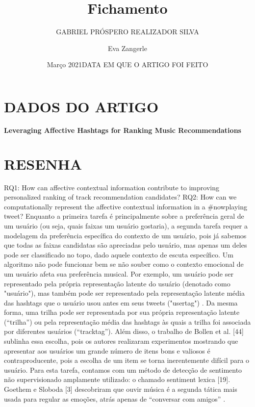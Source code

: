 \documentclass{article}
\title{Fichamento}
\author{GABRIEL PRÓSPERO REALIZADOR  SILVA}
\date{Março 2021}
\begin{document}
\maketitle

\section{DADOS DO ARTIGO}
\textbf{Leveraging Affective Hashtags for Ranking Music Recommendations \\}
\author{Eva Zangerle \\}
\date{DATA EM QUE O ARTIGO FOI FEITO}

\section{RESENHA}
RQ1: How can affective contextual information contribute to improving personalized ranking of track recommendation candidates?
RQ2: How can we computationally represent the affective contextual information in a #nowplaying tweet? 
Enquanto a primeira tarefa é principalmente sobre a preferência geral de um usuário (ou seja, quais faixas um usuário gostaria), a segunda tarefa requer a modelagem da preferência específica do contexto de um usuário, pois já sabemos que todas as faixas candidatas são apreciadas pelo usuário, mas apenas um deles pode ser classificado no topo, dado aquele contexto de escuta específico. Um algoritmo não pode funcionar bem se não souber como o contexto emocional de um usuário afeta sua preferência musical.
Por exemplo, um usuário pode ser representado pela própria representação latente do usuário (denotado como "usuário"), mas também pode ser representado pela representação latente média das hashtags que o usuário usou antes em seus tweets ("usertag") . Da mesma forma, uma trilha pode ser representada por sua própria representação latente (“trilha”) ou pela representação média das hashtags às quais a trilha foi associada por diferentes usuários (“tracktag”).
Além disso, o trabalho de Bollen et al. [44] sublinha essa escolha, pois os autores realizaram experimentos mostrando que apresentar aos usuários um grande número de itens bons e valiosos é contraproducente, pois a escolha de um item se torna inerentemente difícil para o usuário.
Para esta tarefa, contamos com um método de detecção de sentimento não supervisionado amplamente utilizado: o chamado sentiment lexica [19].
Goethem e Sloboda [3] descobriram que ouvir música é a segunda tática mais usada para regular as emoções, atrás apenas de “conversar com amigos” .
\end{document}
